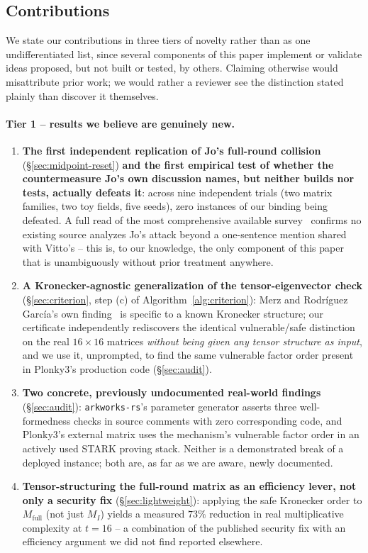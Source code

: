 \documentclass[conference]{IEEEtran}
\theoremstyle{definition}
\theoremstyle{plain}
\begin{document}
\subsection{Contributions}
We state our contributions in three tiers of novelty rather than as one
undifferentiated list, since several components of this paper implement
or validate ideas proposed, but not built or tested, by others. Claiming
otherwise would misattribute prior work; we would rather a reviewer see
the distinction stated plainly than discover it themselves.

\paragraph{Tier 1 -- results we believe are genuinely new.}
\begin{enumerate}[leftmargin=1.3em]
  \item \textbf{The first independent replication of Jo's full-round
  collision} (\S\ref{sec:midpoint-reset}) \textbf{and the first empirical
  test of whether the countermeasure Jo's own discussion names, but
  neither builds nor tests, actually defeats it}: across nine independent
  trials (two matrix families, two toy fields, five seeds), zero
  instances of our binding being defeated. A full read of the most
  comprehensive available survey~\cite{sok2026} confirms no existing
  source analyzes Jo's attack beyond a one-sentence mention shared with
  Vitto's -- this is, to our knowledge, the only component of this paper
  that is unambiguously without prior treatment anywhere.
  \item \textbf{A Kronecker-agnostic generalization of the
  tensor-eigenvector check} (\S\ref{sec:criterion}, step (c) of
  Algorithm~\ref{alg:criterion}): Merz and Rodr\'iguez Garc\'ia's own
  finding~\cite{cryptoeprint:2026/306} is specific to a known Kronecker
  structure; our certificate independently rediscovers the identical
  vulnerable/safe distinction on the real $16\times16$ matrices
  \emph{without being given any tensor structure as input}, and we use
  it, unprompted, to find the same vulnerable factor order present in
  Plonky3's production code (\S\ref{sec:audit}).
  \item \textbf{Two concrete, previously undocumented real-world
  findings} (\S\ref{sec:audit}): \texttt{arkworks-rs}'s parameter
  generator asserts three well-formedness checks in source comments with
  zero corresponding code, and Plonky3's external matrix uses the
  mechanism's vulnerable factor order in an actively used STARK proving
  stack. Neither is a demonstrated break of a deployed instance; both
  are, as far as we are aware, newly documented.
  \item \textbf{Tensor-structuring the full-round matrix as an
  efficiency lever, not only a security fix} (\S\ref{sec:lightweight}):
  applying the safe Kronecker order to $M_{\mathrm{full}}$ (not just
  $M_I$) yields a measured $73\%$ reduction in real multiplicative
  complexity at $t=16$ -- a combination of the published security fix
  with an efficiency argument we did not find reported elsewhere.
\end{enumerate}
\end{document}

